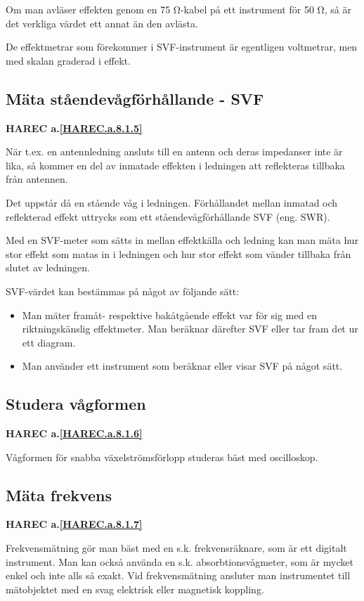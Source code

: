 Om man avläser effekten genom en 75 Ω-kabel på ett instrument för 50
Ω, så är det verkliga värdet ett annat än den avlästa.

De effektmetrar som förekommer i SVF-instrument är egentligen
voltmetrar, men med skalan graderad i effekt.

\subsection{Mäta ståendevågförhållande - SVF}
\textbf{
HAREC a.\ref{HAREC.a.8.1.5}\label{myHAREC.a.8.1.5}
}
\label{mäta ståendevåg}

När t.ex. en antennledning ansluts till en antenn och deras impedanser
inte är lika, så kommer en del av inmatade effekten i ledningen att
reflekteras tillbaka från antennen.

Det uppstår då en stående våg i ledningen. Förhållandet mellan inmatad
och reflekterad effekt uttrycks som ett ståendevågförhållande SVF
(eng. SWR).

Med en SVF-meter som sätts in mellan effektkälla och ledning kan man
mäta hur stor effekt som matas in i ledningen och hur stor effekt som
vänder tillbaka från slutet av ledningen.

SVF-värdet kan bestämmas på något av följande sätt:
\begin{itemize}
\item Man mäter framåt- respektive bakåtgående effekt var för sig med
  en riktningskänslig effektmeter. Man beräknar därefter SVF eller
  tar fram det ur ett diagram.
\item Man använder ett instrument som beräknar eller visar SVF på
  något sätt.
\end{itemize}

\subsection{Studera vågformen}
\textbf{
HAREC a.\ref{HAREC.a.8.1.6}\label{myHAREC.a.8.1.6}
}

Vågformen för snabba växelströmsförlopp studeras bäst med oscilloskop.

\subsection{Mäta frekvens}
\textbf{
HAREC a.\ref{HAREC.a.8.1.7}\label{myHAREC.a.8.1.7}
}

Frekvensmätning gör man bäst med en s.k.  frekvensräknare, som är ett
digitalt instrument.  Man kan också använda en
s.k. absorbtionsvågmeter, som är mycket enkel och inte alls så exakt.
Vid frekvensmätning ansluter man instrumentet till mätobjektet med en
svag elektrisk eller magnetisk koppling.


